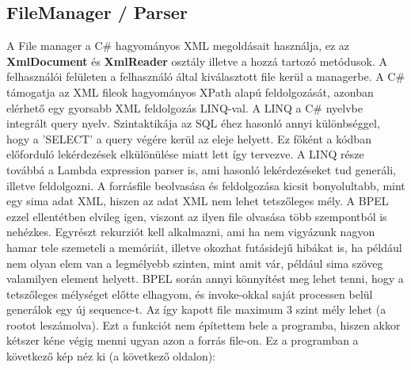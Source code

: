 \subsection{FileManager / Parser }
A File manager a C\# hagyományos XML megoldásait használja, ez az \textbf{XmlDocument} és \textbf{XmlReader} osztály illetve a hozzá tartozó metódusok. A felhasználói felületen a felhasználó által kiválasztott file kerül a managerbe. A C\# támogatja az XML fileok hagyományos XPath alapú feldolgozását, azonban elérhető egy gyorsabb XML feldolgozás LINQ-val. A LINQ a C\# nyelvbe integrált query nyelv. Szintaktikája az SQL éhez hasonló annyi különbséggel, hogy a 'SELECT' a query végére kerül az eleje helyett. Ez főként a kódban előforduló lekérdezések elkülönülése miatt lett így tervezve. A LINQ része továbbá a Lambda expression parser is, ami hasonló lekérdezéseket tud generáli, illetve feldolgozni. 
A forrásfile beolvasása és feldolgozása kicsit bonyolultabb, mint egy sima adat XML, hiszen az adat XML nem lehet tetszőleges mély. A BPEL ezzel ellentétben elvileg igen, viszont az ilyen file olvasása több szempontból is nehézkes. Egyrészt rekurziót kell alkalmazni, ami ha nem vigyázunk nagyon hamar tele szemeteli a memóriát, illetve okozhat futásidejű hibákat is, ha például nem olyan elem van a legmélyebb szinten, mint amit vár, például sima szöveg valamilyen element helyett. BPEL során annyi könnyítést meg lehet tenni, hogy a tetszőleges mélységet előtte elhagyom, és invoke-okkal saját processen belül generálok egy új sequence-t. Az így kapott file maximum 3 szint mély lehet (a rootot leszámolva). Ezt a funkciót nem építettem bele a programba, hiszen akkor kétszer kéne végig menni ugyan azon a forrás file-on.
Ez a programban a következő kép néz ki (a következő oldalon):
\newpage
